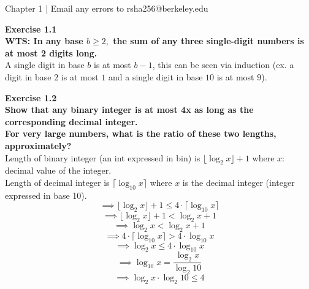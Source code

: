 \documentclass{article}
\newenvironment{problem}[2][Exercise]
    { \begin{mdframed}[backgroundcolor=gray!20] \textbf{#1 #2} \\}
    {  \end{mdframed}}
\begin{document}
\begin{mdframed}[backgroundcolor=blue!20]
Chapter 1 | Email any errors to rsha256@berkeley.edu
\end{mdframed}

\begin{problem}{1.1}
    \textbf{WTS: In any base $b\geq2,$ the sum of any three single-digit numbers is at most 2 digits long.}
    \\
    A single digit in base $b$ is at most $b-1$, this can be seen via induction (ex. a digit in base $2$ is at most $1$ and a single digit in base $10$ is at most $9$).
    
\end{problem}


\begin{problem}{1.2}
    \textbf{Show that any binary integer is at most 4x as long as the corresponding decimal integer.
    \\
    For very large numbers, what is the ratio of these two lengths, approximately?}
    \\
    Length of binary integer (an int expressed in bin) is $\lfloor\log_2 x\rfloor + 1$ where $x:$ decimal value of the integer.
    \\
    Length of decimal integer is $\lceil\log_{10} x\rceil$ where $x$ is the decimal integer (integer expressed in base 10).
    \[
        \implies
        \lfloor\log_2 x\rfloor + 1 \leq 4\cdot\lceil\log_{10} x\rceil
    \]
    \[
        \implies
        \lfloor\log_2 x\rfloor+1<\log_2 x +1
    \]
    \[
        \implies
        \log_2 x<\log_2 x +1
    \]
    \[
        \implies
        4 \cdot\lceil\log_{10} x\rceil >4\cdot\log_{10} x
    \]
    \[
        \implies
        \log_2 x\leq 4\cdot\log_{10} x
    \]
    \[
        \implies
        \log_{10} x = \frac{\log_2 x}{\log_2 10}
    \]
    \[
        \implies
        \boxed{
          \log_2 x \cdot \log_2 10 \leq 4
        }
    \]
\end{problem}
\end{document}
